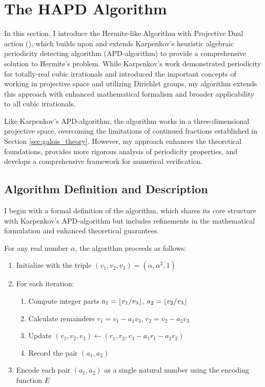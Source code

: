 \section{The HAPD Algorithm}\label{sec:hapd_algorithm}

In this section, I introduce the Hermite-like Algorithm with Projective Dual action (\HAPD), which builds upon and extends Karpenkov's heuristic algebraic periodicity detecting algorithm (APD-algorithm) \cite{Karpenkov2022} to provide a comprehensive solution to Hermite's problem. While Karpenkov's work demonstrated periodicity for totally-real cubic irrationals and introduced the important concepts of working in projective space and utilizing Dirichlet groups, my \HAPD{} algorithm extends this approach with enhanced mathematical formalism and broader applicability to all cubic irrationals.

Like Karpenkov's APD-algorithm, the \HAPD{} algorithm works in a three-dimensional projective space, overcoming the limitations of continued fractions established in Section \ref{sec:galois_theory}. However, my approach enhances the theoretical foundations, provides more rigorous analysis of periodicity properties, and develops a comprehensive framework for numerical verification.

\subsection{Algorithm Definition and Description}

I begin with a formal definition of the \HAPD{} algorithm, which shares its core structure with Karpenkov's APD-algorithm but includes refinements in the mathematical formulation and enhanced theoretical guarantees.

\begin{algorithm_def}\label{alg:hapd}
For any real number $\alpha$, the \HAPD{} algorithm proceeds as follows:
\begin{enumerate}
    \item Initialize with the triple $(v_1, v_2, v_3) = (\alpha, \alpha^2, 1)$
    \item For each iteration:
    \begin{enumerate}
        \item Compute integer parts $a_1 = \lfloor v_1/v_3 \rfloor$, $a_2 = \lfloor v_2/v_3 \rfloor$
        \item Calculate remainders $r_1 = v_1 - a_1v_3$, $r_2 = v_2 - a_2v_3$
        \item Update $(v_1, v_2, v_3) \leftarrow (r_1, r_2, v_3 - a_1r_1 - a_2r_2)$
        \item Record the pair $(a_1, a_2)$
    \end{enumerate}
    \item Encode each pair $(a_1, a_2)$ as a single natural number using the encoding function $E$
\end{enumerate}
\end{algorithm_def}

